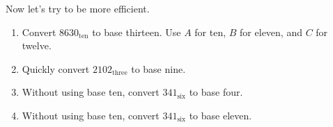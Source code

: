 \begin{prob}
Now let's try to be more efficient.  
\begin{enumerate}
\item Convert $8630_\textrm{ten}$ to base thirteen.  Use $A$ for ten, $B$ for eleven, and $C$ for twelve.  
\item Quickly convert $2102_\textrm{three}$ to base nine.
\item Without using base ten, convert $341_\textrm{six}$ to base four.  
\item Without using base ten, convert $341_\textrm{six}$ to base eleven.
\end{enumerate}
\end{prob}

